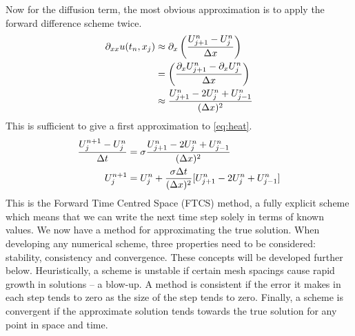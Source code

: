     
    Now for the diffusion term, the most obvious approximation is to apply the forward difference scheme twice.
    \begin{align*}
    \partial_{xx} u(t_n,x_j) &\approx \partial_x \left(\frac{U^n_{j+1}- U^n_j}{\Delta x}\right)\\
    &=  \left(\frac{\partial_xU^n_{j+1} - \partial_xU^n_j}{\Delta x}\right)\\
    &\approx \frac{U^n_{j+1} - 2U^n_{j} + U^n_{j-1}}{(\Delta x)^2}
    \end{align*}
    This is sufficient to give a first approximation to \eqref{eq:heat}.
    \begin{align}\label{eq:FTCS_heat}
    \frac{U^{n+1}_j- U^n_j}{\Delta t} &= \sigma \frac{U^n_{j+1} - 2U^n_{j} + U^n_{j-1}}{(\Delta x)^2}\\
    U^{n+1}_j &= U^n_j +  \frac{\sigma\Delta t}{(\Delta x)^2}\lbrack U^n_{j+1} - 2U^n_{j} + U^n_{j-1}\rbrack 
    \end{align}
    This is the Forward Time Centred Space (FTCS) method, a fully explicit scheme which means that we can write the next time step solely in terms of known values. We now have a method for approximating the true solution. When developing any numerical scheme, three properties need to be considered: stability, consistency and convergence. These concepts will be developed further below. Heuristically, a scheme is unstable if certain mesh spacings cause rapid growth in solutions -- a blow-up. A method is consistent if the error it makes in each step tends to zero as the size of the step tends to zero. Finally, a scheme is convergent if the approximate solution tends towards the true solution for any point in space and time. 
    
